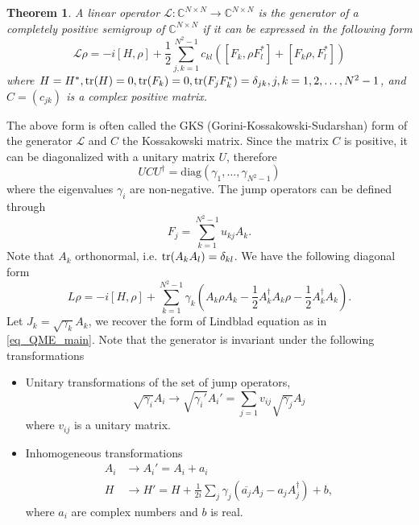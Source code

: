 \documentclass[10pt]{article}  %
\theoremstyle{plain}
\newtheorem{theorem}{Theorem}[section]
\numberwithin{equation}{section}
\newcommand{\rbracket}[1]{\left(#1\right)}      %
\def\mL{\mathcal{L}}
\def\C{\mathbb{C}}
\newcommand{\diag}{\text{diag}}
\renewcommand{\C}{\mathbb{C}}
\begin{document}
\begin{theorem}
A linear operator $\mL: \C^{N\times N} \to \C^{N\times N}$ is the generator of a completely positive semigroup of $\C^{N \times N}$ if it can be expressed in the following form
\begin{equation}\label{eq_GKS}
	\mL \rho = -i[H, \rho] + \frac{1}{2} \sum_{j, k = 1}^{N^2-1}c_{kl}\rbracket{[F_k, \rho F_l^*] + [F_k \rho, F_l^*]}
\end{equation}
where $H = H^*, \tr(H) = 0, \tr(F_k) = 0, \tr(F_jF_k^*) = \delta_{jk}, j, k = 1,2, \dots, N^2-1$, and $C = (c_{jk})$ is a complex positive matrix. 
\end{theorem}
The above form is often called the GKS (Gorini-Kossakowski-Sudarshan) form of the generator $\mL$ and $C$ the Kossakowski matrix. Since the matrix $C$ is positive, it can be diagonalized with a unitary matrix $U$, therefore 
\begin{equation}
	UCU^\dagger = \diag(\gamma_1, \dots, \gamma_{N^2-1})
\end{equation}
where the eigenvalues $\gamma_i$ are non-negative. The jump operators can be defined through 
\begin{equation}
	F_j = \sum_{k = 1}^{N^2 - 1}u_{kj}A_k.
\end{equation}
Note that $A_k$ orthonormal, i.e. $\tr(A_kA_l) = \delta_{kl}$. We have the following diagonal form
\begin{equation}
	L\rho = -i[H, \rho] + \sum_{k = 1}^{N^2 - 1}\gamma_k \rbracket{A_k\rho A_k - \frac{1}{2}A_k^\dagger A_k \rho - \frac{1}{2}A_k^\dagger A_k}.
\end{equation}
Let $J_k = \sqrt{\gamma_k}A_k$, we recover the form of Lindblad equation as in \eqref{eq_QME_main}. Note that the generator is invariant under the following transformations
\begin{itemize}
	\item Unitary transformations of the set of jump operators,
	$$ \sqrt{\gamma_i}A_i \to \sqrt{\gamma_i'}A_i' = \sum_{j = 1}v_{ij}\sqrt{\gamma_j}A_j$$
	where $v_{ij}$ is a unitary matrix.
	\item Inhomogeneous transformations
	\begin{align}
		A_i &\to A_i' = A_i + a_i\\
		H &\to H' = H + \frac{1}{2i}\sum_j \gamma_j\rbracket{\overline{a_j}A_j - a_jA_j^\dagger} + b,
	\end{align}
	where $a_i$ are complex numbers and $b$ is real.
\end{itemize}
\end{document}
